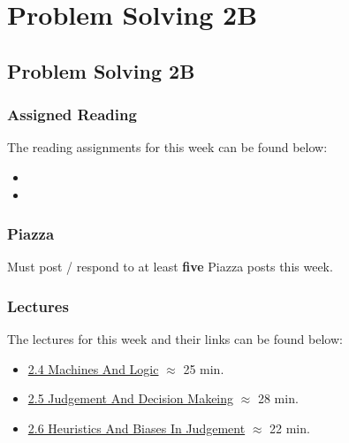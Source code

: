 \clearpage

\renewcommand{\ChapTitle}{Problem Solving 2B}
\renewcommand{\SectionTitle}{Problem Solving 2B}

\chapter{\ChapTitle}
\section{\SectionTitle}

\subsection{Assigned Reading}

The reading assignments for this week can be found below:

\begin{itemize}
    \item {}
    \item {}
\end{itemize}

\subsection{Piazza}

Must post / respond to at least \textbf{five} Piazza posts this week.  

\subsection{Lectures}

The lectures for this week and their links can be found below:

\begin{itemize}
    \item \href{https://www.youtube.com/watch?v=8h0okzEM13M}{2.4 Machines And Logic} $\approx$ 25 min.
    \item \href{https://www.youtube.com/watch?v=IdZDwzxaCIY}{2.5 Judgement And Decision Makeing} $\approx$ 28 min.
    \item \href{https://www.youtube.com/watch?v=l6-UHqMy4Gg}{2.6 Heuristics And Biases In Judgement} $\approx$ 22 min.
\end{itemize}

